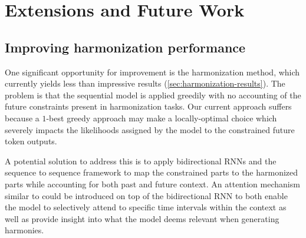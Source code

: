 



\section{Extensions and Future Work}\label{sec:future-work}

\subsection{Improving harmonization performance}

One significant opportunity for improvement is the harmonization method, which
currently yields less than impressive results
(\cref{sec:harmonization-results}). The problem is that the sequential model is
applied greedily with no accounting of the future constraints present in
harmonization tasks. Our current approach suffers because a $1$-best greedy
approach may make a locally-optimal choice which severely impacts the
likelihoods assigned by the model to the constrained future token outputs.

A potential solution to address this is to apply bidirectional
RNNs\citep{Graves2005} and the sequence to sequence
framework\citep{sutskever2014sequence} to map the constrained parts to the
harmonized parts while accounting for both past and future context. An
attention mechanism similar to \citet{Bahdanau2015} could be introduced on top
of the bidirectional RNN to both enable the model to selectively attend to
specific time intervals within the context as well as provide insight into what
the model deems relevant when generating harmonies.

